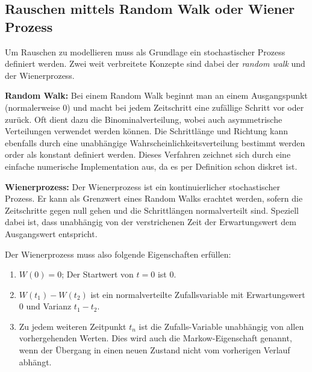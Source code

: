 \subsection{Rauschen mittels Random Walk oder Wiener Prozess\label{brown:Rauschen:RandomWalkWiener}}

Um Rauschen zu modellieren muss als Grundlage ein stochastischer Prozess definiert werden. Zwei weit verbreitete Konzepte sind dabei der \textit{random walk} und der Wienerprozess.

\begin{definition}\textbf{Random Walk:}
	\label{randomWalk}
	Bei einem Random Walk beginnt man an einem Ausgangspunkt (normalerweise 0) und macht bei jedem Zeitschritt eine zufällige Schritt vor oder zurück. Oft dient dazu die Binominalverteilung, wobei auch asymmetrische Verteilungen verwendet werden können. Die Schrittlänge und Richtung kann ebenfalls durch eine unabhängige Wahrscheinlichkeitsverteilung bestimmt werden order als konstant definiert werden. Dieses Verfahren zeichnet sich durch eine einfache numerische Implementation aus, da es per Definition schon diskret ist.
\end{definition}

\begin{definition}\textbf{Wienerprozess:}
	\label{wienerprozess}
	Der Wienerprozess ist ein kontinuierlicher stochastischer Prozess. Er kann als Grenzwert eines Random Walks erachtet werden, sofern die Zeitschritte gegen null gehen und die Schrittlängen normalverteilt sind. Speziell dabei ist, dass unabhängig von der verstrichenen Zeit der Erwartungswert dem Ausgangswert entspricht.
\end{definition}

Der Wienerprozess muss also folgende Eigenschaften erfüllen: 



\begin{enumerate}
	\item $ W(0) = 0 $; Der Startwert von $ t = 0 $ ist 0.
	\item $ W(t_{1}) - W(t_{2}) $ ist ein normalverteilte Zufallsvariable mit Erwartungswert 0 und Varianz $ t_{1} - t_{2} $.
	\item Zu jedem weiteren Zeitpunkt $ t_{n} $ ist die Zufalls-Variable unabhängig von allen vorhergehenden Werten. Dies wird auch die Markow-Eigenschaft genannt, wenn der Übergang in einen neuen Zustand nicht vom vorherigen Verlauf abhängt.
\end{enumerate}

